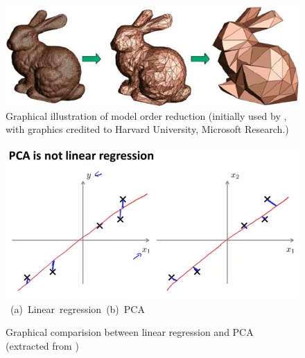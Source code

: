 \begin{figure}[ht] 
\vbox{\vspace{-1cm}
\centering
\includegraphics[width=.72\textwidth]{./Pics/Introduction/Graphical-illustration-of-model-order-reduction.png}
\vspace{0.cm}
\vspace{0.5cm}
}   
\caption{Graphical illustration of model order reduction (initially used by \citet{Schilders2008}, with graphics credited to Harvard University, Microsoft Research.)}
\vspace{1.5cm}
\label{fig:IllustrationMOR}
\end{figure}

\begin{figure}[ht] 
\vbox{\vspace{-1cm}
\centering
\includegraphics[width=.72\textwidth]{./Pics/PCA_LinReg/PCA_is_not_LinReg.png}
\vspace{0.cm}
\hbox{\hspace{0.25cm} (a) Linear regression \hspace{2cm} (b) PCA \hspace{3.0cm}}
\vspace{0.5cm}
}   
\caption{Graphical comparision between linear regression and PCA (extracted from \citet{AndrewNg_2018})}
\vspace{1.5cm}
\label{fig:PCA_is_not_LinReg}
\end{figure}
\clearpage

